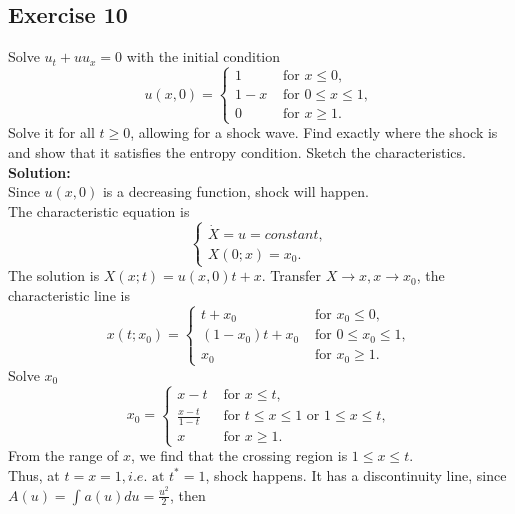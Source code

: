 \documentclass[12pt]{article}%
\begin{document}
\subsection*{Exercise 10}
Solve $u_{t}+uu_{x}=0$ with the initial condition 
\begin{equation*}u(x,0)=
    \begin{cases}
        1 & \text{ for } x \le 0,\\
        1-x & \text{ for } 0\le x\le 1,\\
        0 & \text{ for }  x\ge 1.
    \end{cases}
\end{equation*}
Solve it for all $t\ge0$, allowing for a shock wave.
Find exactly where the shock is and show that it satisfies the entropy condition.
Sketch the characteristics.\\
\textbf{Solution:}\\
Since $u(x,0)$ is a decreasing function, shock will happen.\\
The characteristic equation is 
\begin{equation*}
    \begin{cases}
        \dot{X}=u=constant, \\
        X(0; x)=x_{0}.
    \end{cases}   
\end{equation*}
The solution is $X(x; t)=u(x,0)t+x$. Transfer $X\to x, x\to x_{0}$, the characteristic line is 
\begin{equation*}x(t;x_{0})=
    \begin{cases}
        t+x_{0} & \text{ for } x_{0} \le 0,\\
        (1-x_{0})t+x_{0} & \text{ for } 0\le x_{0}\le 1,\\
        x_{0} & \text{ for }  x_{0}\ge 1.
    \end{cases}
\end{equation*}
Solve $x_{0}$
\begin{equation*}x_{0}=
    \begin{cases}
        x-t & \text{ for } x \le t,\\
        \frac{x-t}{1-t} & \text{ for } t \le x \le 1  \text{ or } 1 \le x \le t, \\
        x & \text{ for }  x\ge 1.
    \end{cases}
\end{equation*}
From the range of $x$, we find that the crossing region is $1\le x\le t$.\\
Thus, at  $t=x=1, i.e. \text{ at } t^{*}=1$, shock happens. It has a discontinuity line, since $A(u)=\int_{}^{}a(u)du=\frac{u^2}{2}$, then
\end{document}

